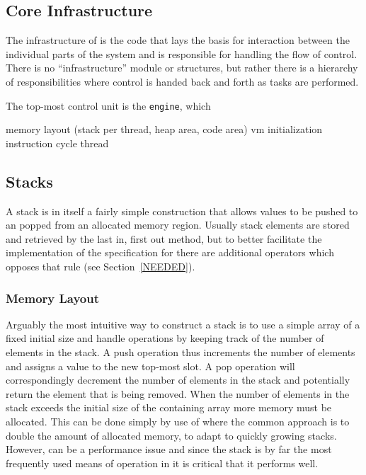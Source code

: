 
\subsection{Core Infrastructure}

The infrastructure of \thename{} is the code that lays the basis for interaction
between the individual parts of the system and is responsible for handling the
flow of control. There is no ``infrastructure'' module or structures, but rather
there is a hierarchy of responsibilities where control is handed back and forth
as tasks are performed.

The top-most control unit is the \texttt{engine}, which

memory layout (stack per thread, heap area, code area)
vm initialization
instruction cycle
thread


\subsection{Stacks}

A stack is in itself a fairly simple construction that allows values
to be pushed to an popped from an allocated memory region. Usually
stack elements are stored and retrieved by the last in, first out
method, but to better facilitate the implementation of the
specification for \thename{} there are additional operators which
opposes that rule (see Section~\ref{NEEDED}).

\subsubsection{Memory Layout}

Arguably the most intuitive way to construct a stack is to use a
simple array of a fixed initial size and handle operations by keeping
track of the number of elements in the stack. A push operation thus
increments the number of elements and assigns a value to the new
top-most slot. A pop operation will correspondingly decrement the
number of elements in the stack and potentially return the element
that is being removed. When the number of elements in the stack
exceeds the initial size of the containing array more memory must be
allocated. This can be done simply by use of  where the
common approach is to double the amount of allocated memory, to adapt
to quickly growing stacks. However,  can be a
performance issue and since the stack is by far the most frequently
used means of operation in \thename{} it is critical that it performs
well.


